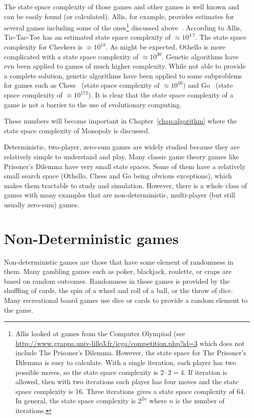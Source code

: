 The state space complexity of those games and other games is well known and can
be easily found (or calculated). Allis, for example, provides estimates for
several games including some of the ones\footnote{Allis looked at games from the
Computer Olympiad (see
\url{http://www.grappa.univ-lille3.fr/icga/competition.php?id=3} which does not
include The Prisoner's Dilemma. However, the state space for The Prisoner's
Dilemma is easy to calculate. With a single iteration, each player has two
possible moves, so the state space complexity is \(2\cdot2=4\). If iteration is
allowed, then with two iterations each player has four moves and the state space
complexity is 16. Three iterations gives a state space complexity of 64. In
general, the state space complexity is \(2^{2n}\) where \(n\) is the number of
iterations.} discussed above~\cite{Allis1994}. According to Allis, Tic-Tac-Toe
has an estimated state space complexity of \(\approx10^{3.7}\). The state space
complexity for Checkers is \(\approx10^{18}\). As might be expected, Othello is
more complicated with a state space complexity of \(\approx10^{30}\). Genetic
algorithms have evn been applied to games of much higher complexity. While not
able to provide a complete solution, genetic algorithms have been applied to
some subproblems for games such as Chess~\cite{Mitsuta:2010:OPG:1994486.1994517}
(state space complexity of \(\approx10^{50}\)) and
Go~\cite{shah2012Go,Blackman2009Go} (state space complexity of
\(\approx10^{172}\)). It is clear that the state space complexity of a game is
not a barrier to the use of evolutionary computing.

These numbers will become important in Chapter~\ref{chap:algorithm} where the
state space complexity of Monopoly is discussed.

Deterministic, two-player, zero-sum games are widely studied because they are
relatively simple to understand and play. Many classic game theory games like
Prisoner's Dilemma have very small state spaces. Some of them have a relatively
small search space (Othello, Chess and Go being obvious exceptions), which makes
them tractable to study and simulation. However, there is a whole class of games
with many examples that are non-deterministic, multi-player (but still usually
zero-sum) games.

\section{Non-Deterministic games}

Non-deterministic games are those that have some element of randomness in them.
Many gambling games such as poker, blackjack, roulette, or craps are based
on random outcomes. Randomness in those games is provided by the shuffling of
cards, the spin of a wheel and roll of a ball, or the throw of dice. Many
recreational board games use dice or cards to provide a random element to the
game. 


